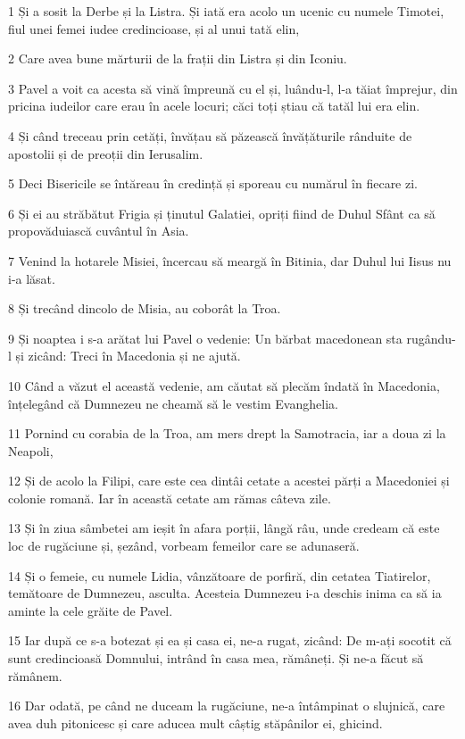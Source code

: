 \par 1 Și a sosit la Derbe și la Listra. Și iată era acolo un ucenic cu numele Timotei, fiul unei femei iudee credincioase, și al unui tată elin,
\par 2 Care avea bune mărturii de la frații din Listra și din Iconiu.
\par 3 Pavel a voit ca acesta să vină împreună cu el și, luându-l, l-a tăiat împrejur, din pricina iudeilor care erau în acele locuri; căci toți știau că tatăl lui era elin.
\par 4 Și când treceau prin cetăți, învățau să păzească învățăturile rânduite de apostolii și de preoții din Ierusalim.
\par 5 Deci Bisericile se întăreau în credință și sporeau cu numărul în fiecare zi.
\par 6 Și ei au străbătut Frigia și ținutul Galatiei, opriți fiind de Duhul Sfânt ca să propovăduiască cuvântul în Asia.
\par 7 Venind la hotarele Misiei, încercau să meargă în Bitinia, dar Duhul lui Iisus nu i-a lăsat.
\par 8 Și trecând dincolo de Misia, au coborât la Troa.
\par 9 Și noaptea i s-a arătat lui Pavel o vedenie: Un bărbat macedonean sta rugându-l și zicând: Treci în Macedonia și ne ajută.
\par 10 Când a văzut el această vedenie, am căutat să plecăm îndată în Macedonia, înțelegând că Dumnezeu ne cheamă să le vestim Evanghelia.
\par 11 Pornind cu corabia de la Troa, am mers drept la Samotracia, iar a doua zi la Neapoli,
\par 12 Și de acolo la Filipi, care este cea dintâi cetate a acestei părți a Macedoniei și colonie romană. Iar în această cetate am rămas câteva zile.
\par 13 Și în ziua sâmbetei am ieșit în afara porții, lângă râu, unde credeam că este loc de rugăciune și, șezând, vorbeam femeilor care se adunaseră.
\par 14 Și o femeie, cu numele Lidia, vânzătoare de porfiră, din cetatea Tiatirelor, temătoare de Dumnezeu, asculta. Acesteia Dumnezeu i-a deschis inima ca să ia aminte la cele grăite de Pavel.
\par 15 Iar după ce s-a botezat și ea și casa ei, ne-a rugat, zicând: De m-ați socotit că sunt credincioasă Domnului, intrând în casa mea, rămâneți. Și ne-a făcut să rămânem.
\par 16 Dar odată, pe când ne duceam la rugăciune, ne-a întâmpinat o slujnică, care avea duh pitonicesc și care aducea mult câștig stăpânilor ei, ghicind.
